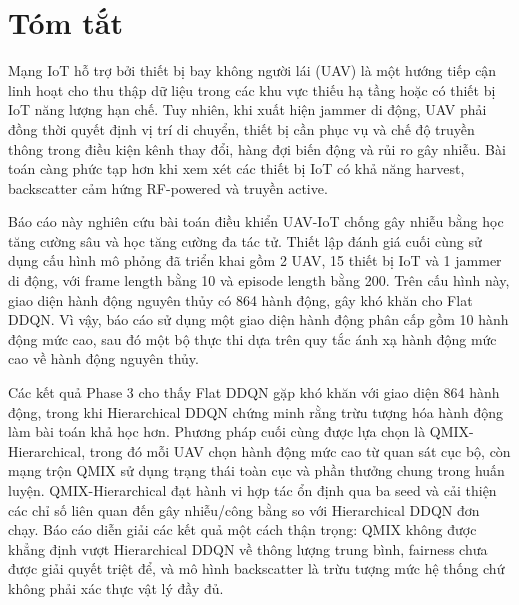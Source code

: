 \chapter*{Tóm tắt}

Mạng IoT hỗ trợ bởi thiết bị bay không người lái (UAV) là một hướng tiếp cận linh hoạt cho thu thập dữ liệu trong các khu vực thiếu hạ tầng hoặc có thiết bị IoT năng lượng hạn chế. Tuy nhiên, khi xuất hiện jammer di động, UAV phải đồng thời quyết định vị trí di chuyển, thiết bị cần phục vụ và chế độ truyền thông trong điều kiện kênh thay đổi, hàng đợi biến động và rủi ro gây nhiễu. Bài toán càng phức tạp hơn khi xem xét các thiết bị IoT có khả năng harvest, backscatter cảm hứng RF-powered và truyền active.

Báo cáo này nghiên cứu bài toán điều khiển UAV-IoT chống gây nhiễu bằng học tăng cường sâu và học tăng cường đa tác tử. Thiết lập đánh giá cuối cùng sử dụng cấu hình mô phỏng đã triển khai gồm 2 UAV, 15 thiết bị IoT và 1 jammer di động, với frame length bằng 10 và episode length bằng 200. Trên cấu hình này, giao diện hành động nguyên thủy có 864 hành động, gây khó khăn cho Flat DDQN. Vì vậy, báo cáo sử dụng một giao diện hành động phân cấp gồm 10 hành động mức cao, sau đó một bộ thực thi dựa trên quy tắc ánh xạ hành động mức cao về hành động nguyên thủy.

Các kết quả Phase 3 cho thấy Flat DDQN gặp khó khăn với giao diện 864 hành động, trong khi Hierarchical DDQN chứng minh rằng trừu tượng hóa hành động làm bài toán khả học hơn. Phương pháp cuối cùng được lựa chọn là QMIX-Hierarchical, trong đó mỗi UAV chọn hành động mức cao từ quan sát cục bộ, còn mạng trộn QMIX sử dụng trạng thái toàn cục và phần thưởng chung trong huấn luyện. QMIX-Hierarchical đạt hành vi hợp tác ổn định qua ba seed và cải thiện các chỉ số liên quan đến gây nhiễu/công bằng so với Hierarchical DDQN đơn chạy. Báo cáo diễn giải các kết quả một cách thận trọng: QMIX không được khẳng định vượt Hierarchical DDQN về thông lượng trung bình, fairness chưa được giải quyết triệt để, và mô hình backscatter là trừu tượng mức hệ thống chứ không phải xác thực vật lý đầy đủ.

\clearpage

